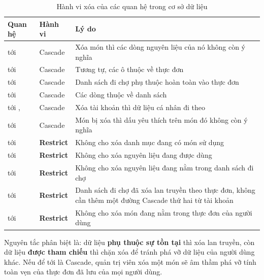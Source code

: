 \begin{table}[H]
\centering
\caption{Hành vi xóa của các quan hệ trong cơ sở dữ liệu}
\label{tab:hanh-vi-xoa}
\begin{tabularx}{\textwidth}{|P{5.0cm}|P{1.9cm}|Y|}
\hline
\bfseries Quan hệ & \bfseries Hành vi & \bfseries Lý do \\ \hline
{} tới  & Cascade & Xóa món thì các dòng
  nguyên liệu của nó không còn ý nghĩa \\ \hline
{} tới  & Cascade & Tương tự, các ô thuộc
  về thực đơn \\ \hline
{} tới  & Cascade & Danh sách đi chợ phụ thuộc
  hoàn toàn vào thực đơn \\ \hline
{} tới  & Cascade & Các dòng thuộc
  về danh sách \\ \hline
{} tới ,  & Cascade & Xóa tài
  khoản thì dữ liệu cá nhân đi theo \\ \hline
{} tới  & Cascade & Món bị xóa thì dấu yêu thích
  trên món đó không còn ý nghĩa \\ \hline
{} tới  & \textbf{Restrict} & Không cho xóa danh mục
  đang có món sử dụng \\ \hline
{} tới  & \textbf{Restrict} & Không
  cho xóa nguyên liệu đang được dùng \\ \hline
{} tới  & \textbf{Restrict} & Không cho xóa
  nguyên liệu đang nằm trong danh sách đi chợ \\ \hline
{} tới  & \textbf{Restrict} & Danh
  sách đi chợ đã xóa lan truyền theo thực đơn, không cần thêm một đường Cascade
  thứ hai từ tài khoản \\ \hline
{} tới  & \textbf{Restrict} & Không cho xóa món
  đang nằm trong thực đơn của người dùng \\ \hline
\end{tabularx}
\end{table}

Nguyên tắc phân biệt là: dữ liệu \textbf{phụ thuộc sự tồn tại} thì xóa lan
truyền, còn dữ liệu \textbf{được tham chiếu} thì chặn xóa để tránh phá vỡ dữ liệu
của người dùng khác. Nếu để  tới  là Cascade,
quản trị viên xóa một món sẽ âm thầm phá vỡ tính toàn vẹn của thực đơn đã lưu của
mọi người dùng.

